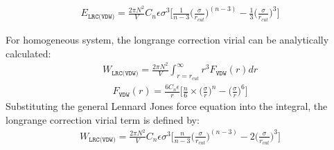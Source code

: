 \documentclass[letterpaper,10pt,english]{sphinxmanual}
\begin{document}
\begin{description}
\begin{equation*}
\begin{split}E_{\texttt{LRC(VDW)}} = \frac{2\pi N^2}{V} C_{n} \epsilon {\sigma}^3 \bigg[\frac{1}{n-3}\bigg(\frac{\sigma}{r_{cut}}\bigg)^{(n-3)} - \frac{1}{3} \bigg(\frac{\sigma}{r_{cut}}\bigg)^3\bigg]\end{split}
\end{equation*}
\item[{\sphinxcode{\sphinxupquote{Virial}}}] \leavevmode
\sphinxAtStartPar
For homogeneous system, the long\sphinxhyphen{}range correction virial can be analytically calculated:
\begin{equation*}
\begin{split}W_{\texttt{LRC(VDW)}} = \frac{2\pi N^2}{V} \int_{r=r_{cut}}^{\infty} r^3 F_{\texttt{VDW}}(r) dr\end{split}
\end{equation*}\begin{equation*}
\begin{split}F_{\texttt{VDW}}(r) = \frac{6C_{n} \epsilon}{r} \bigg[\frac{n}{6} \times \bigg(\frac{\sigma}{r}\bigg)^{n} - \bigg(\frac{\sigma}{r}\bigg)^6\bigg]\end{split}
\end{equation*}
\sphinxAtStartPar
Substituting the general Lennard Jones force equation into the integral, the long\sphinxhyphen{}range correction virial term is defined by:
\begin{equation*}
\begin{split}W_{\texttt{LRC(VDW)}} = \frac{2\pi N^2}{V} C_{n} \epsilon {\sigma}^3 \bigg[\frac{n}{n-3}\bigg(\frac{\sigma}{r_{cut}}\bigg)^{(n-3)} - 2 \bigg(\frac{\sigma}{r_{cut}}\bigg)^3\bigg]\end{split}
\end{equation*}
\end{description}
\end{document}
